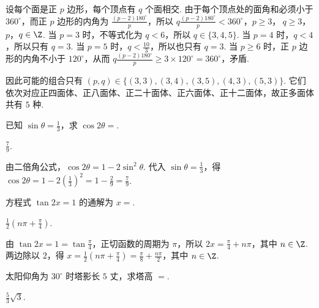 \documentclass[UTF8,a4paper,oneside,11pt]{ctexbook}
\begin{document}
\begin{solution}
设每个面是正 \(p\) 边形，每个顶点有 \(q\) 个面相交. 由于每个顶点处的面角和必须小于 \(360^{\circ}\)，而正 \(p\) 边形的内角为 \(\frac{(p-2)180^{\circ}}{p}\)，所以
\(q\frac{(p-2)180^{\circ}}{p}<360^{\circ}\)，\(p\ge3\)，\(\ q\ge3\)，\(p\)，\(q\in\Z\).
当 \(p=3\) 时，不等式化为 \(q<6\)，所以 \(q\in\{3,4,5\}\). 当 \(p=4\) 时，\(q<4\)，所以只有 \(q=3\). 当 \(p=5\) 时，\(q<\frac{10}{3}\)，所以也只有 \(q=3\). 当 \(p\ge6\) 时，正 \(p\) 边形的内角不小于 \(120^{\circ}\)，从而 \(q\frac{(p-2)180^{\circ}}{p}\ge3\times120^{\circ}=360^{\circ}\)，矛盾.

因此可能的组合只有 \((p,q)\in\{(3,3),(3,4),(3,5),(4,3),(5,3)\}\). 它们依次对应正四面体、正八面体、正二十面体、正六面体、正十二面体，故正多面体共有 \(5\) 种.
\end{solution}

\begin{problem}
已知 \(\sin \theta = \frac{1}{3}\)，求 \(\cos 2\theta=\)\fillinblank{}.
\end{problem}

\begin{answer}
\(\frac{7}{9}\).
\end{answer}

\begin{solution}
由二倍角公式，\(\cos2\theta=1-2\sin^{2}\theta\). 代入 \(\sin\theta=\frac13\)，得 \(\cos2\theta=1-2\left(\frac13\right)^{2}=1-\frac29=\frac79\).
\end{solution}

\begin{problem}
方程式 \(\tan 2x = 1\) 的通解为 \(x=\)\fillinblank{}.
\end{problem}

\begin{answer}
\(\frac{1}{2}\left( n\pi + \frac{\pi}{4} \right)\).
\end{answer}

\begin{solution}
由 \(\tan2x=1=\tan\frac{\pi}{4}\)，正切函数的周期为 \(\pi\)，所以 \(2x=\frac{\pi}{4}+n\pi\)，其中 \(n\in\Z\). 两边除以 \(2\)，得 \(x=\frac12\left(n\pi+\frac{\pi}{4}\right)=\frac{\pi}{8}+\frac{n\pi}{2}\)，其中 \(n\in\Z\).
\end{solution}

\begin{problem}
太阳仰角为 \(30^{\circ}\) 时塔影长 \(5\text{ 丈}\)，求塔高 \(=\)\fillinblank{}.
\end{problem}

\begin{answer}
\(\frac{5}{3}\sqrt{3}\).
\end{answer}
\end{document}
